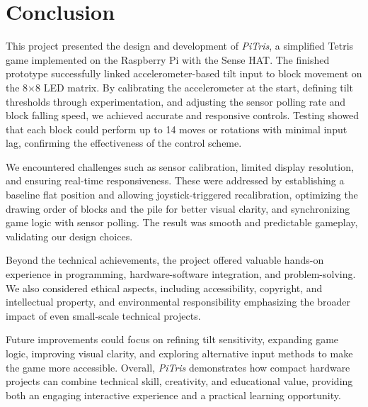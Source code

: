 \documentclass[12pt]{report}
\begin{document}
\chapter{Conclusion}

This project presented the design and development of \textit{PiTris}, a simplified Tetris game implemented on the Raspberry Pi with the Sense HAT. The finished prototype successfully linked accelerometer-based tilt input to block movement on the 8×8 LED matrix. By calibrating the accelerometer at the start, defining tilt thresholds through experimentation, and adjusting the sensor polling rate and block falling speed, we achieved accurate and responsive controls. Testing showed that each block could perform up to 14 moves or rotations with minimal input lag, confirming the effectiveness of the control scheme.

We encountered challenges such as sensor calibration, limited display resolution, and ensuring real-time responsiveness. These were addressed by establishing a baseline flat position and allowing joystick-triggered recalibration, optimizing the drawing order of blocks and the pile for better visual clarity, and synchronizing game logic with sensor polling. The result was smooth and predictable gameplay, validating our design choices.

Beyond the technical achievements, the project offered valuable hands-on experience in programming, hardware-software integration, and problem-solving. We also considered ethical aspects, including accessibility, copyright, and intellectual property, and environmental responsibility emphasizing the broader impact of even small-scale technical projects.

Future improvements could focus on refining tilt sensitivity, expanding game logic, improving visual clarity, and exploring alternative input methods to make the game more accessible. Overall, \textit{PiTris} demonstrates how compact hardware projects can combine technical skill, creativity, and educational value, providing both an engaging interactive experience and a practical learning opportunity.








\end{document}
